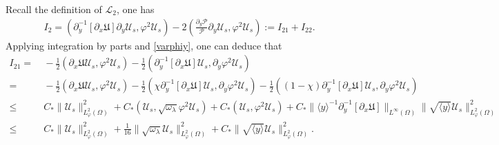 \documentclass{amsart}
\numberwithin{equation}{section}
\newcommand\y{{{\langle y \rangle}}}
\begin{document}
Recall the definition of $\mathcal{L}_{2}$, one has
\begin{align}\label{I20}
I_{2}= \left(\partial_{y}^{-1}[\partial_{x}\mathfrak{U}]\partial_{y}\mathcal{U}_{s},\varphi^{2}\mathcal{U}_{s}\right)
      -2\left(\frac{\partial_{y}\mathcal{P}}{\mathcal{P}}\partial_{y}\mathcal{U}_{s},\varphi^{2}\mathcal{U}_{s}\right)
    :=I_{21}+I_{22}.
\end{align}
Applying integration by parts and \eqref{varphiy}, one can deduce that
\begin{align}\label{I21}
I_{21}
=&~-\frac{1}{2}(\partial_{x}\mathfrak{U}\mathcal{U}_{s},\varphi^{2}\mathcal{U}_{s})
  -\frac{1}{2}(\partial_{y}^{-1}\left[\partial_{x}\mathfrak{U}\right]\mathcal{U}_{s},\partial_{y}\varphi^{2}\mathcal{U}_{s})\\
=&~-\frac{1}{2}(\partial_{x}\mathfrak{U}\mathcal{U}_{s},\varphi^{2}\mathcal{U}_{s})
  -\frac{1}{2}(\chi\partial_{y}^{-1}\left[\partial_{x}\mathfrak{U}\right]\mathcal{U}_{s},\partial_{y}\varphi^{2}\mathcal{U}_{s})
  -\frac{1}{2}((1-\chi)\partial_{y}^{-1}\left[\partial_{x}\mathfrak{U}\right]\mathcal{U}_{s},\partial_{y}\varphi^{2}\mathcal{U}_{s})\nonumber\\
\leq&~C_{*}\|\mathcal{U}_{s}\|_{L_{\varphi}^{2}(\Omega)}^{2}
     +C_{*}(\mathcal{U}_{s},\sqrt{\omega_{\lambda}}\varphi^{2}\mathcal{U}_{s})
     +C_{*}(\mathcal{U}_{s},\varphi^{2}\mathcal{U}_{s})
     +C_{*}\|\y^{-1}\partial_{y}^{-1}\left[\partial_{x}\mathfrak{U}\right]\|_{L^{\infty}(\Omega)}
       \|\sqrt{\y}\mathcal{U}_{s}\|_{L_{\varphi}^{2}(\Omega)}^{2}\nonumber\\
\leq&~C_{*}\|\mathcal{U}_{s}\|_{L_{\varphi}^{2}(\Omega)}^{2}
     +\frac{1}{16}\|\sqrt{\omega_{\lambda}}\mathcal{U}_{s}\|_{L_{\varphi}^{2}(\Omega)}^{2}
     +C_{*}\|\sqrt{\y}\mathcal{U}_{s}\|_{L_{\varphi}^{2}(\Omega)}^{2}.\nonumber
\end{align}
\end{document}
